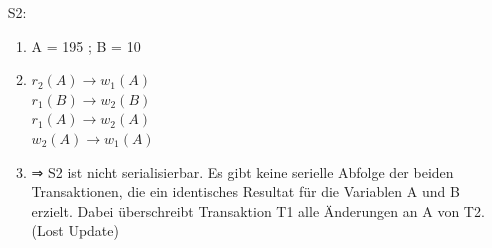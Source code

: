 \documentclass{article}
\begin{document}
\begin{enumerate}
\begin{enumerate}
\begin{enumerate}
                \end{enumerate}
            \item[S2:]
                \begin{enumerate}
                    \item A = 195 ; B = 10
                    \item   $r_2(A) \longrightarrow w_1(A)$ \\
                            $r_1(B) \longrightarrow w_2(B)$ \\
                            $r_1(A) \longrightarrow w_2(A)$ \\
                            $w_2(A) \longrightarrow w_1(A)$ \\
                    \item ⇒ S2 ist nicht serialisierbar. Es gibt keine serielle Abfolge der beiden Transaktionen, die ein identisches
                            Resultat für die Variablen A und B erzielt. Dabei überschreibt Transaktion T1 alle Änderungen an A von T2. (Lost Update)


\end{enumerate}
\end{enumerate}
\end{enumerate}
\end{document}
